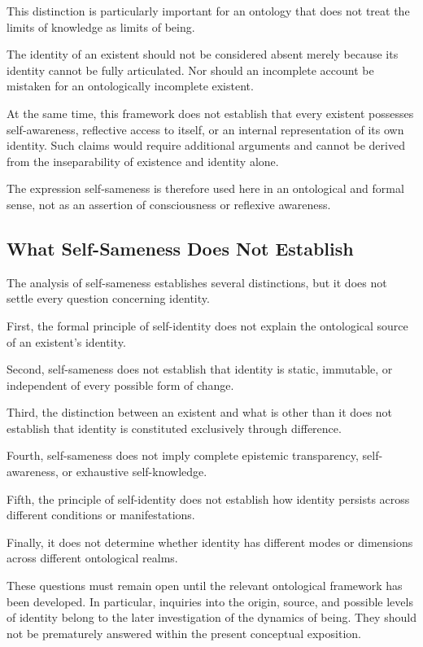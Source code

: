 This distinction is particularly important for an ontology that does not treat the limits of knowledge as limits of being.

The identity of an existent should not be considered absent merely because its identity cannot be fully articulated. Nor should an incomplete account be mistaken for an ontologically incomplete existent.

At the same time, this framework does not establish that every existent possesses self-awareness, reflective access to itself, or an internal representation of its own identity. Such claims would require additional arguments and cannot be derived from the inseparability of existence and identity alone.

The expression self-sameness is therefore used here in an ontological and formal sense, not as an assertion of consciousness or reflexive awareness.

\subsection{What Self-Sameness Does Not Establish}

The analysis of self-sameness establishes several distinctions, but it does not settle every question concerning identity.

First, the formal principle of self-identity does not explain the ontological source of an existent's identity.

Second, self-sameness does not establish that identity is static, immutable, or independent of every possible form of change.

Third, the distinction between an existent and what is other than it does not establish that identity is constituted exclusively through difference.

Fourth, self-sameness does not imply complete epistemic transparency, self-awareness, or exhaustive self-knowledge.

Fifth, the principle of self-identity does not establish how identity persists across different conditions or manifestations.

Finally, it does not determine whether identity has different modes or dimensions across different ontological realms.

These questions must remain open until the relevant ontological framework has been developed. In particular, inquiries into the origin, source, and possible levels of identity belong to the later investigation of the dynamics of being. They should not be prematurely answered within the present conceptual exposition.

